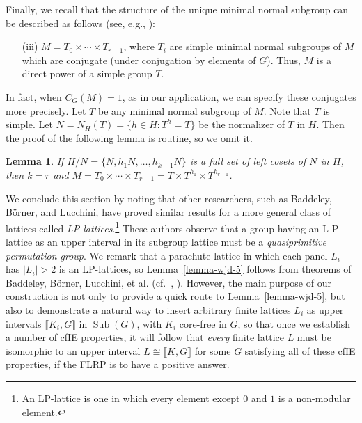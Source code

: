 \documentclass{gen-j-l}
\newcommand{\lb}{\ensuremath{\llbracket}}
\newcommand{\rb}{\ensuremath{\rrbracket}}
\newcommand{\<}{\ensuremath{\langle}}
\renewcommand{\>}{\ensuremath{\rangle}}
\theoremstyle{plain}
\newtheorem{lemma}[theorem]{Lemma}
\theoremstyle{definition}
\theoremstyle{remark}
\numberwithin{theorem}{section}
\numberwithin{claim}{section}
\numberwithin{equation}{section}
\numberwithin{conjecture}{section}
\newcommand{\defn}[1]{\emph{#1}}
\newcommand{\Sub}{\ensuremath{\operatorname{Sub}}}
\newcommand{\2}{\ensuremath{\mathbf{2}}}
\newcommand{\3}{\ensuremath{\mathbf{3}}}
\begin{document}
Finally, we recall that the structure of the unique minimal normal subgroup can be
described as follows (see, e.g., \cite[Theorem 4.3.A]{Dixon:1996}):
\begin{enumerate}[(i)]
\item[(iii)] $M = T_0\times \cdots \times T_{r-1}$, where $T_i$ are simple minimal normal subgroups of
  $M$ which are conjugate (under conjugation by elements of $G$). Thus, $M$ is a
  direct power of a simple group $T$.
\end{enumerate}
  In fact, when $C_G(M)=1$, as in our application,
we can specify these conjugates more precisely. %
Let $T$ be any minimal normal subgroup of $M$. Note that $T$ is simple.
Let $N = N_H(T) = \{h\in H : T^h = T\}$ be the normalizer of $T$ in
$H$.  Then the proof of the following lemma is routine, so we omit it.
\begin{lemma}
If $H/N = \{N, h_1N, \dots, h_{k-1}N\}$ is a full set of left cosets of $N$
in $H$, then $k=r$ and $M = T_0\times \cdots \times T_{r-1} = T \times
T^{h_1} \times T^{h_{r-1}}$. 
\end{lemma}

We conclude this section by noting that other researchers, such as Baddeley,
B\"orner, and Lucchini, have proved similar results 
for a more general class of lattices called 
\defn{LP-lattices}.\footnote{An LP-lattice is one in which
  every element except $0$ and $1$ is a non-modular element.}
These authors observe that a group having an L-P lattice as an upper
interval in its subgroup lattice must be a \emph{quasiprimitive permutation group}. 
We remark that a parachute lattice in which each panel
 $L_i$ has $|L_i|>2$ is an LP-lattices, so
Lemma~\ref{lemma-wjd-5} follows from
theorems of Baddeley, B\"orner, Lucchini, et al. 
(cf.~\cite{Lucchini:1997}, \cite{Borner:1999}).
However, the main purpose of our construction is not only to
provide a quick route to Lemma~\ref{lemma-wjd-5}, but also to
demonstrate a natural way to insert arbitrary finite lattices
$L_i$ as upper intervals $\lb K_i, G \rb$ in $\Sub(G)$, with $K_i$ core-free in
$G$, so that once we establish a number of \acs{cfIE} properties,
it will follow that \emph{every} finite lattice $L$ must be isomorphic to an upper
interval $L \cong \lb K, G \rb$ for some $G$ satisfying all of these \acs{cfIE} properties,
if the \acs{FLRP} is to have a positive answer.   
\end{document}
